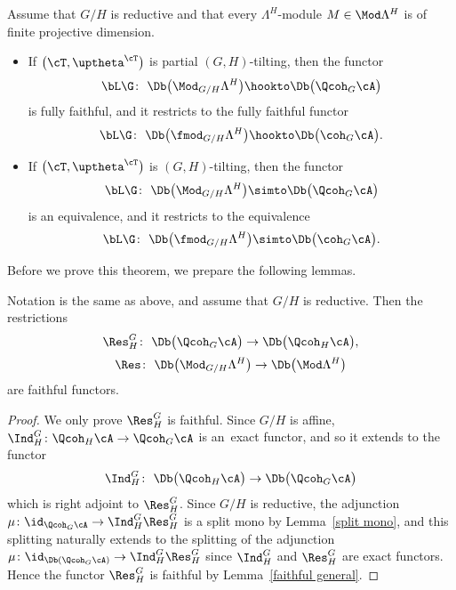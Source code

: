 \begin{thm}\label{derived equiv}
Assume that $G/H$ is reductive and that every $\Lambda^H$-module $M\in \Mod\Lambda^H$ is of finite projective dimension.
\begin{itemize}\itemsep=0pt
\item[$1.$]
If $\big(\cT,\uptheta^{\cT}\big)$ is partial $(G,H)$-tilting, then the functor
\begin{gather*}
\bL \G\colon\ \Db\big(\Mod_{G/H}\Lambda^H\big)\hookto \Db\big(\Qcoh_G{\cA}\big)
\end{gather*}
is fully faithful, and it restricts to the fully faithful functor
\begin{gather*}
\bL \G\colon\ \Db\big(\fmod_{G/H}\Lambda^H\big)\hookto \Db\big(\coh_G{\cA}\big).
\end{gather*}
\item[$2.$] If $\big(\cT,\uptheta^{\cT}\big)$ is $(G,H)$-tilting, then the functor
\begin{gather*}
\bL \G\colon\ \Db\big(\Mod_{G/H}\Lambda^H\big)\simto \Db\big(\Qcoh_G{\cA}\big)
\end{gather*}
is an equivalence, and it restricts to the equivalence
\begin{gather*}
\bL \G\colon\ \Db\big(\fmod_{G/H}\Lambda^H\big)\simto \Db\big(\coh_G{\cA}\big).
\end{gather*}
\end{itemize}
\end{thm}

Before we prove this theorem, we prepare the following lemmas.
\begin{lem}\label{faithful lemma}
Notation is the same as above, and assume that $G/H$ is reductive.
Then the restrictions
\begin{gather*}
\Res^G_H\colon\ \Db\big(\Qcoh_G\cA\big)\to \Db\big(\Qcoh_H\cA\big),
\\[.5ex]
\Res\colon\ \Db\big(\Mod_{G/H}\Lambda^H\big)\to \Db\big(\Mod\Lambda^H\big)
\end{gather*}
are faithful functors.
\begin{proof}
We only prove $\Res^G_H$ is faithful. Since $G/H$ is affine, $\Ind^G_H\colon \Qcoh_H\cA\to \Qcoh_G\cA$ is an~exact functor, and so it extends to the functor
\begin{gather*}
\Ind^G_H\colon\ \Db\big(\Qcoh_H\cA\big)\to \Db\big(\Qcoh_G\cA\big)
\end{gather*}
which is right adjoint to $\Res^G_H$.
 Since $G/H$ is reductive, the adjunction $\mu\colon \id_{\Qcoh_G\cA} \to\Ind^G_H\Res^G_H$ is a split mono by Lemma~\ref{split mono}, and this splitting naturally extends to the splitting of the adjunction $\mu\colon \id_{\Db\left(\Qcoh_G\cA\right)} \to\Ind^G_H\Res^G_H$ since $\Ind^G_H$ and $\Res^G_H$ are exact functors. Hence the functor $\Res^G_H$ is faithful by Lemma~\ref{faithful general}.
\end{proof}
\end{lem}

